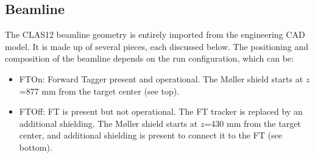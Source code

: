 \subsection{Beamline} \label{sec:beamline}
The CLAS12 beamline geometry is entirely imported from the engineering CAD model.
It is made up of several pieces, each discussed below. The positioning and composition of the beamline
depends on the run configuration, which can be:

\begin{itemize}
	\item FTOn: Forward Tagger present and operational. The M\o ller shield starts at $z$=877 mm from the target center (see  top).
	\item FTOff: FT is present but not operational. The FT tracker is replaced by an additional shielding.
                 The M\o ller shield starts at $z$=430 mm from the target center, and additional shielding
                 is present to connect it to the FT (see  bottom).
\end{itemize}


